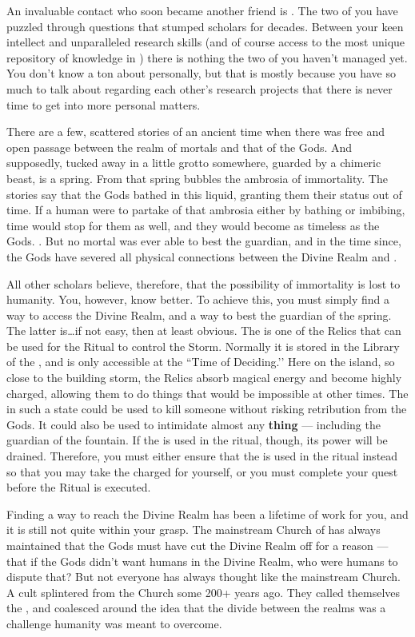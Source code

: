 \documentclass[char]{GL2020}
\begin{document}
An invaluable contact who soon became another friend is \cLibrarian{\full}. The two of you have puzzled through questions that stumped scholars for decades. Between your keen intellect and \cLibrarian{\their} unparalleled research skills (and of course access to the most unique repository of knowledge in \pEarth{}) there is nothing the two of you haven’t managed yet. You don’t know a ton about \cLibrarian{\them} personally, but that is mostly because you have so much to talk about regarding each other’s research projects that there is never time to get into more personal matters.

There are a few, scattered stories of an ancient time when there was free and open passage between the realm of mortals and that of the Gods. And supposedly, tucked away in a little grotto somewhere, guarded by a chimeric beast, is a spring. From that spring bubbles the ambrosia of immortality. The stories say that the Gods bathed in this liquid, granting them their status out of time. If a human were to partake of that ambrosia either by bathing or imbibing, time would stop for them as well, and they would become as timeless as the Gods. . But no mortal was ever able to best the guardian, and in the time since, the Gods have severed all physical connections between the Divine Realm and \pEarth{}.

All other scholars believe, therefore, that the possibility of immortality is lost to humanity. You, however, know better. To achieve this, you must simply find a way to access the Divine Realm, and a way to best the guardian of the spring. The latter is\ldots if not easy, then at least obvious. 
The \iScythe{} is one of the \pFarm{} Relics that can be used for the Ritual to control the Storm. Normally it is stored in the Library of the \pSc{}, and is only accessible at the ``Time of Deciding.’’ Here on the island, so close to the building storm, the Relics absorb magical energy and become highly charged, allowing them to do things that would be impossible at other times. The \iScythe{} in such a state could be used to kill someone without risking retribution from the Gods. It could also be used to intimidate almost any \textbf{thing} — including the guardian of the fountain. If the \iScythe{} is used in the ritual, though, its power will be drained. Therefore, you must either ensure that the \iPitcher{} is used in the ritual instead so that you may take the charged \iScythe{} for yourself, or you must complete your quest before the Ritual is executed.

Finding a way to reach the Divine Realm has been a lifetime of work for you, and it is still not quite within your grasp. The mainstream Church of \cFarmGod{} has always maintained that the Gods must have cut the Divine Realm off for a reason — that if the Gods didn’t want humans in the Divine Realm, who were humans to dispute that? But not everyone has always thought like the mainstream Church. A cult splintered from the Church some 200+ years ago. They called themselves the \cDisneySect{}, and coalesced around the idea that the divide between the realms was a challenge humanity was meant to overcome.
\end{document}
